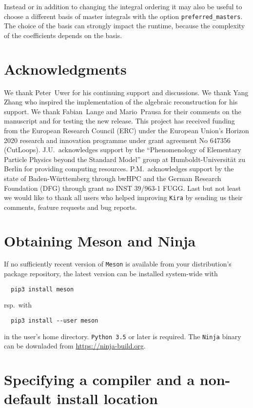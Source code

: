 \documentclass[a4paper,12pt]{article}
\newcommand*{\kira}{\texttt{Kira}}
\begin{document}
Instead or in addition to changing the integral ordering it may also be useful
to choose a different basis of master integrals with the option
\texttt{preferred\_masters}. The choice of the basis can strongly impact the
runtime, because the complexity of the coefficients depends on the basis.


\section*{Acknowledgments}

We thank Peter~Uwer for his continuing support and discussions.
We thank Yang Zhang who inspired the implementation of the algebraic
reconstruction for his support.
We thank Fabian~Lange and Mario~Prausa for their comments on the manuscript and
for testing the new release.
This project has received funding from the European Research Council (ERC) under
the European Union's Horizon 2020 research and innovation programme under grant
agreement No 647356 (CutLoops).
J.U.\ acknowledges support by the ``Phenomenology of Elementary Particle
Phy\-sics beyond the Standard Model'' group at Humboldt-Universit\"at zu Berlin
for providing computing resources.
P.M.\ acknowledges support by the state of Baden-Württemberg through bwHPC and
the German Research Foundation (DFG) through grant no INST 39/963-1 FUGG.
Last but not least we would like to thank all users who helped improving \kira{}
by sending us their comments, feature requests and bug reports.


\appendix

\section{Obtaining Meson and Ninja}
\label{gettingmeson}

If no sufficiently recent version of \texttt{Meson} is available from your
distribution's package repository, the latest version can be installed
system-wide with
%
\begin{verbatim}
  pip3 install meson
\end{verbatim}
%
rsp.\ with
%
\begin{verbatim}
  pip3 install --user meson
\end{verbatim}
%
in the user's home directory.
\texttt{Python 3.5} or later is required.
The \texttt{Ninja} binary can be downladed from \url{https://ninja-build.org}.


\section{Specifying a compiler and a non-default install location}
\label{compiledependencies}
\end{document}
